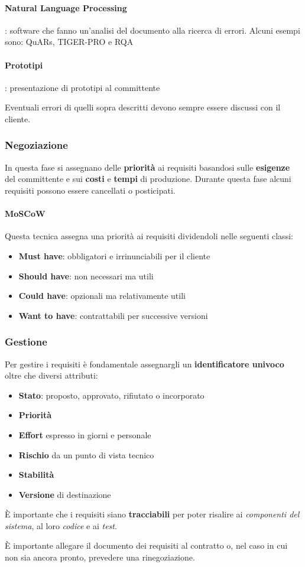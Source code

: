 \paragraph{Natural Language Processing}: software che fanno un'analisi del documento alla ricerca di errori. Alcuni esempi sono: QuARs, TIGER-PRO e RQA
\paragraph{Prototipi}: presentazione di prototipi al committente

\begin{note}
	Eventuali errori di quelli sopra descritti devono sempre essere discussi con il cliente.
\end{note}

\subsubsection{Negoziazione}
In questa fase si assegnano delle \textbf{priorità} ai requisiti basandosi sulle \textbf{esigenze} del committente e sui \textbf{costi} e \textbf{tempi} di produzione. Durante questa fase alcuni requisiti possono essere cancellati o  posticipati.

\paragraph{MoSCoW} Questa tecnica assegna una priorità ai requisiti dividendoli nelle seguenti classi:
\begin{itemize}
	\item \textbf{Must have}: obbligatori e irrinunciabili per il cliente
	\item \textbf{Should have}: non necessari ma utili
	\item \textbf{Could have}: opzionali ma relativamente utili
	\item \textbf{Want to have}: contrattabili per successive versioni
\end{itemize}

\subsubsection{Gestione}
Per gestire i requisiti è fondamentale assegnargli un \textbf{identificatore univoco} oltre che diversi attributi:
\begin{itemize}
	\item \textbf{Stato}: proposto, approvato, rifiutato o incorporato
	\item \textbf{Priorità}
	\item \textbf{Effort} espresso in giorni e personale
	\item \textbf{Rischio} da un punto di vista tecnico
	\item \textbf{Stabilità}
	\item \textbf{Versione} di destinazione
\end{itemize}
È importante che i requisiti siano \textbf{tracciabili} per poter risalire ai \textit{componenti del sistema}, al loro \textit{codice} e ai \textit{test}.

\begin{note}
	È importante allegare il documento dei requisiti al contratto o, nel caso in cui non sia ancora pronto, prevedere una rinegoziazione.
\end{note}